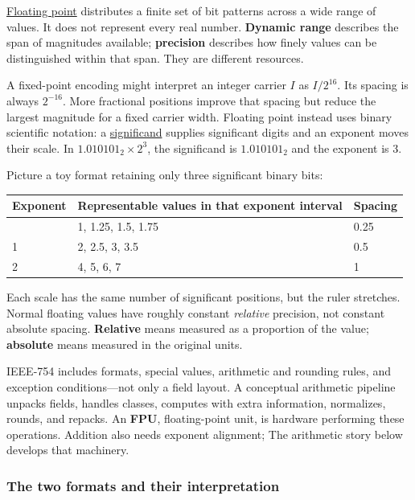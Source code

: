 \hypertarget{01-foundations-i-ch001-a-movable-binary-point}{}

\hyperref[appendix-343615f49ddf]{Floating point} distributes a finite set of bit patterns across a wide range of values. It does not represent every real number. \textbf{Dynamic range} describes the span of magnitudes available; \textbf{precision} describes how finely values can be distinguished within that span. They are different resources.

A fixed-point encoding might interpret an integer carrier \(I\) as \(I/2^{16}\). Its spacing is always \(2^{-16}\). More fractional positions improve that spacing but reduce the largest magnitude for a fixed carrier width. Floating point instead uses binary scientific notation: a \hyperref[appendix-a24fd710cf67]{significand} supplies significant digits and an exponent moves their scale. In \(1.010101_2\times2^3\), the significand is \(1.010101_2\) and the exponent is 3.

Picture a toy format retaining only three significant binary bits:

{\def\LTcaptype{none} %
\begin{longtable}[]{@{}lll@{}}
\toprule\noalign{}
Exponent & Representable values in that exponent interval & Spacing \\
\midrule\noalign{}
\endhead
\bottomrule\noalign{}
\endlastfoot
0 & 1, 1.25, 1.5, 1.75 & 0.25 \\
1 & 2, 2.5, 3, 3.5 & 0.5 \\
2 & 4, 5, 6, 7 & 1 \\
\end{longtable}
}

Each scale has the same number of significant positions, but the ruler stretches. Normal floating values have roughly constant \emph{relative} precision, not constant absolute spacing. \textbf{Relative} means measured as a proportion of the value; \textbf{absolute} means measured in the original units.

IEEE-754 includes formats, special values, arithmetic and rounding rules, and exception conditions---not only a field layout. A conceptual arithmetic pipeline unpacks fields, handles classes, computes with extra information, normalizes, rounds, and repacks. An \textbf{FPU}, floating-point unit, is hardware performing these operations. Addition also needs exponent alignment; The arithmetic story below develops that machinery.

\subsubsection{The two formats and their interpretation}\label{01-foundations-i-ch001-the-two-formats-and-their-interpretation}

